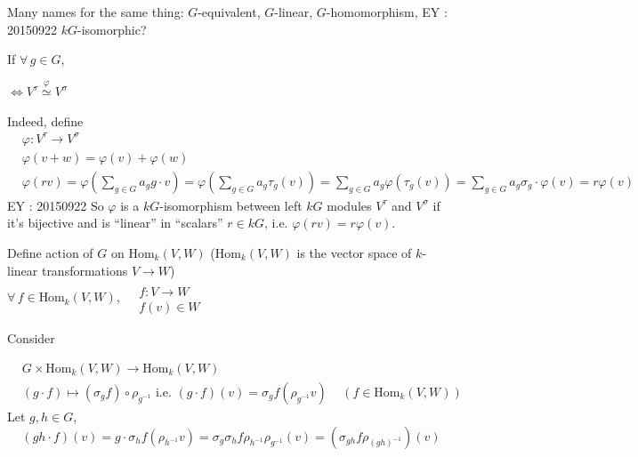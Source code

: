 Many names for the same thing: $G$-equivalent, $G$-linear, $G$-homomorphism, EY : 20150922 $kG$-isomorphic?

If $\forall \, g \in G$, 

  $\Longleftrightarrow  V^{\tau} \overset{\varphi}{\simeq} V^{\sigma}$

Indeed, define 
\[
\begin{aligned}
& \varphi: V^{\tau} \to V^{\sigma} \\ 
& \varphi(v+w) = \varphi(v) + \varphi(w) \\ 
& \varphi(rv) = \varphi( \sum_{g\in G} a_g g \cdot v) = \varphi( \sum_{g \in G} a_g \tau_g(v) ) = \sum_{ g\in G} a_g \varphi(\tau_g(v)) = \sum_{g\in G} a_g \sigma_g \cdot \varphi(v) = r\varphi(v)
\end{aligned}
\]
EY : 20150922 So $\varphi$ is a $kG$-isomorphism between left $kG$ modules $V^{\tau}$ and $V^{\sigma}$ if it's bijective and is ``linear'' in ``scalars'' $r\in kG$, i.e. $\varphi(rv) = r\varphi(v)$.  

Define action of $G$ on $\text{Hom}_k(V,W)$ ($\text{Hom}_k(V,W)$ is the vector space of $k$-linear transformations $V\to W$) \\
$\forall \, f \in \text{Hom}_k(V,W)$, $\begin{aligned} & \quad \\
& f : V \to W \\
& f(v) \in W \end{aligned}$ \quad \, 

Consider

\[
\begin{aligned}
& G \times \text{Hom}_k(V,W) \to \text{Hom}_k(V,W) \\ 
& (g\cdot f) \mapsto (\sigma_g f) \circ \rho_{g^{-1}} \text{ i.e. } (g\cdot f)(v) = \sigma_gf(\rho_{g^{-1}}v) \quad \, (f\in \text{Hom}_k(V,W))
\end{aligned}
\]
Let $g,h \in G$, 
\[
(gh \cdot f)(v) = g\cdot \sigma_h f(\rho_{h^{-1}}v) = \sigma_g\sigma_h f\rho_{h^{-1}} \rho_{g^{-1}}(v) = (\sigma_{gh} f \rho_{(gh)^{-1}} )(v)
\]

